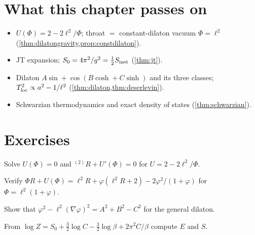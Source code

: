 \section*{What this chapter passes on}
\begin{itemize}[nosep]
\item $U(\Phi)=2-2\ell^2/\Phi$; throat $=$ constant-dilaton vacuum $\Phi=\ell^2$ (\cref{thm:dilatongravity,prop:constdilaton}).
\item JT expansion; $S_0=4\pi^2/g^2=\frac12S_{\rm inst}$ (\cref{thm:jt}).
\item Dilaton $A\sin+\cos(B\cosh+C\sinh)$ and its three classes; $T_{\rm loc}^2\propto a^2-1/\ell^2$ (\cref{thm:dilaton,thm:deserlevin}).
\item Schwarzian thermodynamics and exact density of states (\cref{thm:schwarzian}).
\end{itemize}

\section*{Exercises}
\begin{exercise}
Solve $U(\Phi)=0$ and ${}^{(2)}\!R+U'(\Phi)=0$ for $U=2-2\ell^2/\Phi$.
\end{exercise}
\begin{exercise}
Verify $\Phi R+U(\Phi)=\ell^2R+\varphi(\ell^2R+2)-2\varphi^2/(1+\varphi)$ for $\Phi=\ell^2(1+\varphi)$.
\end{exercise}
\begin{exercise}
Show that $\varphi^2-\ell^2(\nabla\varphi)^2=A^2+B^2-C^2$ for the general dilaton.
\end{exercise}
\begin{exercise}
From $\log Z=S_0+\frac32\log C-\frac32\log\beta+2\pi^2C/\beta$ compute $E$ and $S$.
\end{exercise}

